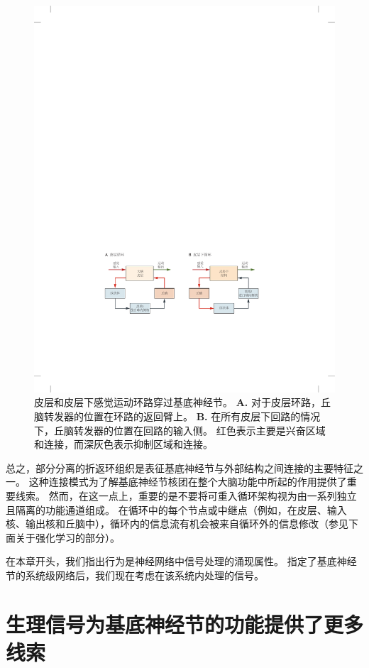 \begin{figure}[htbp]
	\centering
	\includegraphics[width=0.87\linewidth]{chap38/fig_38_5}
	\caption{皮层和皮层下感觉运动环路穿过基底神经节。
		\textbf{A.} 对于皮层环路，丘脑转发器的位置在环路的返回臂上。
		\textbf{B.} 在所有皮层下回路的情况下，丘脑转发器的位置在回路的输入侧。
		红色表示主要是兴奋区域和连接，而深灰色表示抑制区域和连接。}
	\label{fig:38_5}
\end{figure}


总之，部分分离的折返环组织是表征基底神经节与外部结构之间连接的主要特征之一。
这种连接模式为了解基底神经节核团在整个大脑功能中所起的作用提供了重要线索。
然而，在这一点上，重要的是不要将可重入循环架构视为由一系列独立且隔离的功能通道组成。
在循环中的每个节点或中继点（例如，在皮层、输入核、输出核和丘脑中），循环内的信息流有机会被来自循环外的信息修改（参见下面关于强化学习的部分）。


在本章开头，我们指出行为是神经网络中信号处理的涌现属性。
指定了基底神经节的系统级网络后，我们现在考虑在该系统内处理的信号。



\section{生理信号为基底神经节的功能提供了更多线索}

